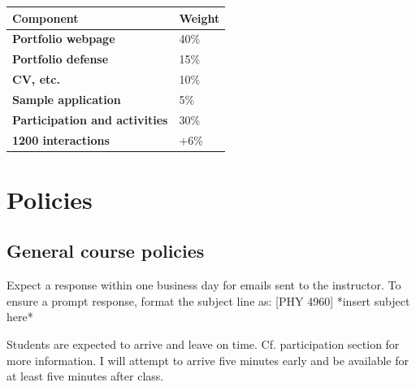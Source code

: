 \documentclass{syllabus}
\begin{document}
\noindent\begin{tabular}{ll}
\textbf{Component} & \textbf{Weight}       \\ \hline
\textbf{Portfolio webpage}            & 40\%  \\
\textbf{Portfolio defense}            & 15\%       \\
\textbf{CV, etc.}            &     10\%   \\
\textbf{Sample application}            & 5\%       \\
\textbf{Participation and activities}            & 30\%       \\
\textbf{1200 interactions}            & +6\%       \\
\end{tabular}%




\section*{Policies}
\subsection{General course policies}
Expect a response within one business day for emails sent to the instructor. To ensure a prompt response, format the subject line as: [PHY 4960] *insert subject here*

Students are expected to arrive and leave on time. Cf. participation section for more information. I will attempt to arrive five minutes early and be available for at least five minutes after class.

\collegepolicies
\end{document}
